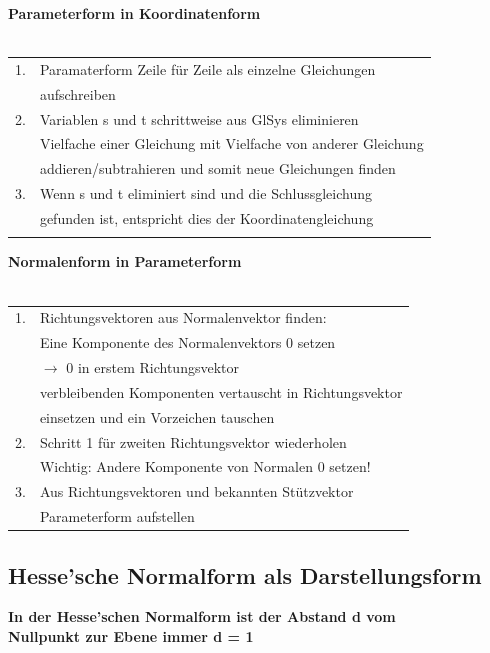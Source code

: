 		    
		    	\textbf{Parameterform in Koordinatenform}\\
			\\
		    	\begin{tabular}{ll}
		    1. &  Paramaterform Zeile für Zeile als einzelne Gleichungen \\
		    & aufschreiben \\
		    2. &  Variablen s und t schrittweise aus GlSys eliminieren  \\
		    & Vielfache einer Gleichung mit Vielfache von anderer Gleichung \\
		    & addieren/subtrahieren und somit neue Gleichungen finden \\
		    3. &  Wenn s und t eliminiert sind und die Schlussgleichung \\
		    & gefunden ist, entspricht dies der Koordinatengleichung  \\
		    \\
		    \end{tabular}		    	 
		    
		    	\textbf{Normalenform in Parameterform} \\
		    	\\
		    	\begin{tabular}{ll}
		    1. & Richtungsvektoren aus Normalenvektor finden:\\
		    & Eine Komponente des Normalenvektors 0 setzen \\
		    & $\rightarrow$ 0 in erstem Richtungsvektor \\
		    & verbleibenden Komponenten vertauscht in Richtungsvektor \\
		    & einsetzen und ein Vorzeichen tauschen \\
		    2. & Schritt 1 für zweiten Richtungsvektor wiederholen  \\
		    & Wichtig: Andere Komponente von Normalen 0 setzen! \\
		    3. & Aus Richtungsvektoren und bekannten Stützvektor \\
		    &  Parameterform aufstellen  \\	   
		    \end{tabular}	    
		    		    
		    	
		    		    
		    		    
		    		    
		    		    
		    \subsection{Hesse'sche Normalform als Darstellungsform}
		    \textbf{In der Hesse'schen Normalform ist der Abstand d vom \\
		    Nullpunkt zur Ebene immer d = 1} 
		    
